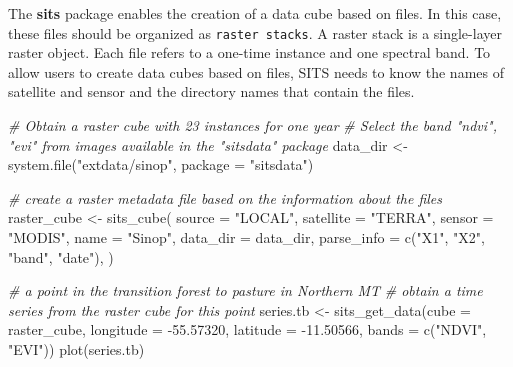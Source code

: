 \documentclass[a4paper,]{tufte-book}
\newenvironment{Shaded}{}{}
\newcommand{\AttributeTok}[1]{\textcolor[rgb]{0.49,0.56,0.16}{#1}}
\newcommand{\CommentTok}[1]{\textcolor[rgb]{0.38,0.63,0.69}{\textit{#1}}}
\newcommand{\FloatTok}[1]{\textcolor[rgb]{0.25,0.63,0.44}{#1}}
\newcommand{\FunctionTok}[1]{\textcolor[rgb]{0.02,0.16,0.49}{#1}}
\newcommand{\NormalTok}[1]{#1}
\newcommand{\OtherTok}[1]{\textcolor[rgb]{0.00,0.44,0.13}{#1}}
\newcommand{\SpecialCharTok}[1]{\textcolor[rgb]{0.25,0.44,0.63}{#1}}
\newcommand{\StringTok}[1]{\textcolor[rgb]{0.25,0.44,0.63}{#1}}
\begin{document}
The \textbf{sits} package enables the creation of a data cube based on files. In this case, these files should be organized as \texttt{raster\ stacks}. A raster stack is a single-layer raster object. Each file refers to a one-time instance and one spectral band. To allow users to create data cubes based on files, SITS needs to know the names of satellite and sensor and the directory names that contain the files.

\begin{Shaded}
\begin{Highlighting}[]
\CommentTok{\# Obtain a raster cube with 23 instances for one year}
\CommentTok{\# Select the band "ndvi", "evi" from images available in the "sitsdata" package}
\NormalTok{data\_dir }\OtherTok{\textless{}{-}} \FunctionTok{system.file}\NormalTok{(}\StringTok{"extdata/sinop"}\NormalTok{, }\AttributeTok{package =} \StringTok{"sitsdata"}\NormalTok{)}

\CommentTok{\# create a raster metadata file based on the information about the files}
\NormalTok{raster\_cube }\OtherTok{\textless{}{-}} \FunctionTok{sits\_cube}\NormalTok{(}
    \AttributeTok{source     =} \StringTok{"LOCAL"}\NormalTok{,}
    \AttributeTok{satellite  =} \StringTok{"TERRA"}\NormalTok{,}
    \AttributeTok{sensor     =} \StringTok{"MODIS"}\NormalTok{,}
    \AttributeTok{name       =} \StringTok{"Sinop"}\NormalTok{,}
    \AttributeTok{data\_dir   =}\NormalTok{ data\_dir,}
    \AttributeTok{parse\_info =} \FunctionTok{c}\NormalTok{(}\StringTok{"X1"}\NormalTok{, }\StringTok{"X2"}\NormalTok{, }\StringTok{"band"}\NormalTok{, }\StringTok{"date"}\NormalTok{),}
\NormalTok{)}

\CommentTok{\# a point in the transition forest to pasture in Northern MT}
\CommentTok{\# obtain a time series from the raster cube for this point}
\NormalTok{series.tb }\OtherTok{\textless{}{-}} \FunctionTok{sits\_get\_data}\NormalTok{(}\AttributeTok{cube      =}\NormalTok{ raster\_cube,}
                           \AttributeTok{longitude =} \SpecialCharTok{{-}}\FloatTok{55.57320}\NormalTok{, }
                           \AttributeTok{latitude  =} \SpecialCharTok{{-}}\FloatTok{11.50566}\NormalTok{,}
                           \AttributeTok{bands     =} \FunctionTok{c}\NormalTok{(}\StringTok{"NDVI"}\NormalTok{, }\StringTok{"EVI"}\NormalTok{))}
\FunctionTok{plot}\NormalTok{(series.tb)}
\end{Highlighting}
\end{Shaded}
\end{document}
